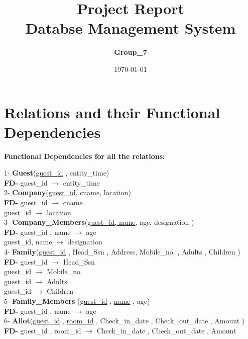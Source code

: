 \documentclass[a4,12pt]{report}
\title{ Project Report \\
				 \textbf{Databse Management System}}
\author{\textbf{Group\_7}}
\date{\today}
\begin{document}
\maketitle


\section*{Relations and their Functional Dependencies}


\begin{flushleft}
 \textbf{ Functional Dependencies for all the relations:} \\
 \end{flushleft}


1- \textbf{Guest}(\uline{guest\_id} ,  entity\_time)  \\
		\textbf{ FD-} guest\_id $ \rightarrow $ entity\_time \\

2- \textbf{Company}(\uline{guest\_id}, cname, location) \\
	\textbf{FD-} guest\_id $ \rightarrow $ cname\\
				\hspace{ 2.00cm }	guest\_id $ \rightarrow $ location \\
					
3- \textbf{Company\_Members}(\uline{guest\_id, name}, age, designation )\\
	\textbf{FD-} 		guest\_id , name $ \rightarrow $   age \\
						guest\_id, name $ \rightarrow $ designation \\

4- \textbf{Family}(\uline{guest\_id} , Head\_Ssn , Address, Mobile\_no. , Adults , Children ) \\
\textbf{FD-} 	guest\_id $ \rightarrow $ Head\_Ssn \\
				guest\_id $ \rightarrow $ Mobile\_no. \\
				guest\_id $ \rightarrow $ Adults \\
				guest\_id $ \rightarrow $ Children \\


5- \textbf{Family\_Members} (\uline{guest\_id} , \uline{name} , age) \\
\textbf{FD-} guest\_id , name $ \rightarrow $ age \\

6-	\textbf{Allot}(\uline{guest\_id} , \uline{room\_id} , Check\_in\_date , Check\_out\_date , Amount ) \\
\textbf{FD-} guest\_id , room\_id $ \rightarrow $ Check\_in\_date , Check\_out\_date , Amount \\
\end{document}
